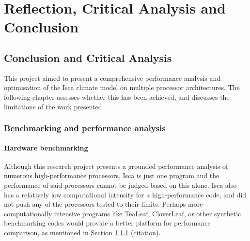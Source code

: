 \documentclass[a4paper,11pt]{report}
\begin{document}
\part{Reflection, Critical Analysis and Conclusion}

\chapter{Conclusion and Critical Analysis}
This project aimed to present a comprehensive performance analysis and optimisation of the Isca climate model on multiple processor architectures. The following chapter assesses whether this has been achieved, and discusses the limitations of the work presented. 
\par
\section{Benchmarking and performance analysis}
\subsection{Hardware benchmarking}
Although this research project presents a grounded performance analysis of numerous high-performance processors, Isca is just one program and the performance of said processors cannot be judged based on this alone. Isca also has a relatively low computational intensity for a high-performance code, and did not push any of the processors tested to their limits. Perhaps more computationally intensive programs like TeaLeaf, CloverLeaf, or other synthetic benchmarking codes would provide a better platform for performance comparison, as mentioned in Section \ref{} (citation).
\end{document}
